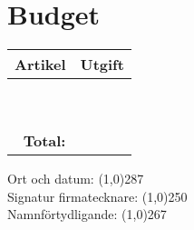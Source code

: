 \documentclass[11pt, includeaddress]{../../classes/cthit}
\begin{document}
\section*{Budget}
\begin{tabular}{ | p{12cm} | p{3cm} |}
	\multicolumn{1}{l}{\large{\textbf{Artikel}}} & \multicolumn{1}{l}{\large{\textbf{Utgift}}} \\
	\hline
	{} & {} \\
	\hline
	{} & {} \\
	\hline
	{} & {} \\
	\hline
	{} & {} \\
	\hline
	{} & {} \\
	\hline
	{} & {} \\
	\hline
	{} & {} \\
	\hline
	{} & {} \\
	\hline
	{} & {} \\
	\hline
	\multicolumn{1}{r|}{ \large{\textbf{Total:}} } & \\ \cline{2-2}


\end{tabular}

\vspace{2cm}

Ort och datum: \line(1,0){287} \\[14pt]
Signatur firmatecknare: \line(1,0){250} \\[14pt]
Namnförtydligande: \line(1,0){267} \\[14pt]
\end{document}
